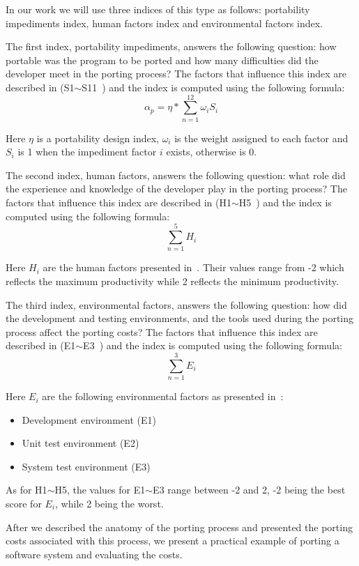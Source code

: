 In our work we will use three indices of this type as follows: portability
impediments index, human factors index and environmental factors index.

The first index, portability impediments, answers the following question: how
portable was the program to be ported and how many difficulties did the
developer meet in the porting process? The factors that influence this index are
described in (S1$\sim$S11~\cite{hakuta}) and the index is computed using the
following formula: \[ \alpha_p = \eta * \sum_{n=1}^{12} \omega_i S_i \]

Here $\eta$ is a portability design index, $\omega_i$ is the weight assigned to
each factor and $S_i$ is 1 when the impediment factor $i$ exists, otherwise is
0.

The second index, human factors, answers the following question: what role did
the experience and knowledge of the developer play in the porting process? The
factors that influence this index are described in (H1$\sim$H5~\cite{hakuta}) and
the index is computed using the following formula: \[ \sum_{n=1}^{5} H_i \]

Here $H_i$ are the human factors presented in~\cite{hakuta}. Their values range
from -2 which reflects the maximum productivity while 2 reflects the minimum
productivity.

The third index, environmental factors, answers the following question: how did
the development and testing environments, and the tools used during the porting
process affect the porting costs? The factors that influence this index are
described in (E1$\sim$E3~\cite{hakuta}) and the index is computed using the
following formula: \[ \sum_{n=1}^{3} E_i \]

Here $E_i$ are the following environmental factors as presented in~\cite{hakuta}:
\begin{itemize}
    \item Development environment (E1)
    \item Unit test environment (E2)
    \item System test environment (E3)
\end{itemize}

As for H1$\sim$H5, the values for E1$\sim$E3 range between -2 and 2, -2 being the best
score for $E_i$, while 2 being the worst.

After we described the anatomy of the porting process and presented the porting
costs associated with this process, we present a practical example of porting a
software system and evaluating the costs.
